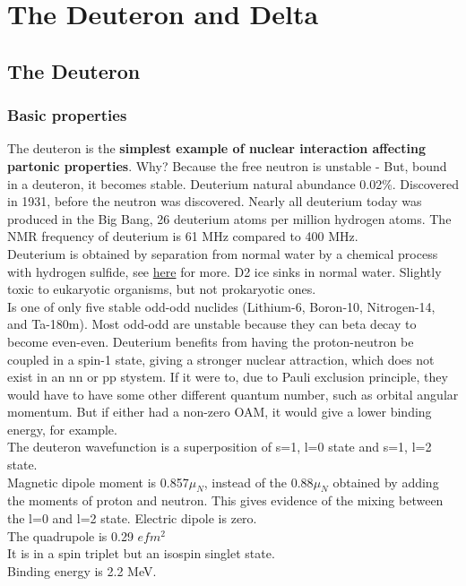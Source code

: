 \chapter{The Deuteron and Delta}
    \section{The Deuteron}
        \subsection{Basic properties}
            The deuteron is the \textbf{simplest example of nuclear interaction affecting partonic properties}. Why? Because the free neutron is unstable - 
            But, bound in a deuteron, it becomes stable. Deuterium natural abundance 0.02\%. Discovered in 1931, before the neutron was discovered. Nearly all deuterium today was produced in the Big Bang, 26 deuterium atoms per million hydrogen atoms. The NMR frequency of deuterium is 61 MHz compared to 400 MHz. \\
            \newline
            Deuterium is obtained by separation from normal water by a chemical process with hydrogen sulfide, see \href{https://en.wikipedia.org/wiki/Girdler_sulfide_process}{here} for more. D2 ice sinks in normal water. Slightly toxic to eukaryotic organisms, but not prokaryotic ones.
            \\
            Is one of only five stable odd-odd nuclides (Lithium-6, Boron-10, Nitrogen-14, and Ta-180m). Most odd-odd are unstable because they can beta decay to become even-even. Deuterium benefits from having the proton-neutron be coupled in a spin-1 state, giving a stronger nuclear attraction, which does not exist in an nn or pp stystem. If it were to, due to Pauli exclusion principle, they would have to have some other different quantum number, such as orbital angular momentum. But if either had a non-zero OAM, it would give a lower binding energy, for example. \\
            The deuteron wavefunction is a superposition of s=1, l=0 state and s=1, l=2 state. \\
            \newline
            Magnetic dipole moment is 0.857$\mu_N$, instead of the $0.88 \mu_N$ obtained by adding the moments of proton and neutron. This gives evidence of the mixing between the l=0 and l=2 state. 
            \newline
            Electric dipole is zero.\\
            \newline            
            The quadrupole is 0.29 $e fm^2$\\
            \newline
            It is in a spin triplet but an isospin singlet state. \\
            \newline
            Binding energy is 2.2 MeV.
            

